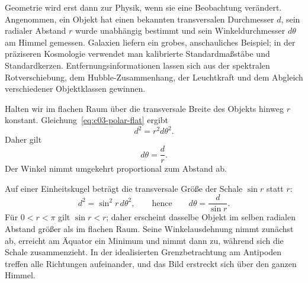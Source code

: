 Geometrie wird erst dann zur Physik, wenn sie eine Beobachtung verändert. Angenommen, ein Objekt hat einen bekannten transversalen Durchmesser \(d\), sein radialer Abstand \(r\) wurde unabhängig bestimmt und sein Winkeldurchmesser \(d\theta\) am Himmel gemessen. Galaxien liefern ein grobes, anschauliches Beispiel; in der präziseren Kosmologie verwendet man kalibrierte Standardmaßstäbe und Standardkerzen. Entfernungsinformationen lassen sich aus der spektralen Rotverschiebung, dem Hubble-Zusammenhang, der Leuchtkraft und dem Abgleich verschiedener Objektklassen gewinnen.

Halten wir im flachen Raum über die transversale Breite des Objekts hinweg \(r\) konstant. Gleichung~\eqref{eq:c03-polar-flat} ergibt
\begin{equation}
d^2 = r^2 d\theta^2.
\label{eq:c03-flat-angle-step}
\end{equation}
Daher gilt
\begin{equation}
d\theta = \frac{d}{r}.
\label{eq:c03-flat-angle}
\end{equation}
Der Winkel nimmt umgekehrt proportional zum Abstand ab.

Auf einer Einheitskugel beträgt die transversale Größe der Schale \(\sin r\) statt \(r\):
\begin{equation}
d^2 = \sin^2 r\, d\theta^2,
\qquad\text{hence}\qquad
d\theta = \frac{d}{\sin r}.
\label{eq:c03-spherical-angle}
\end{equation}
Für \(0<r<\pi\) gilt \(\sin r<r\); daher erscheint dasselbe Objekt im selben radialen Abstand größer als im flachen Raum. Seine Winkelausdehnung nimmt zunächst ab, erreicht am Äquator ein Minimum und nimmt dann zu, während sich die Schale zusammenzieht. In der idealisierten Grenzbetrachtung am Antipoden treffen alle Richtungen aufeinander, und das Bild erstreckt sich über den ganzen Himmel.

\begin{classroomqa}\end{classroomqa}

